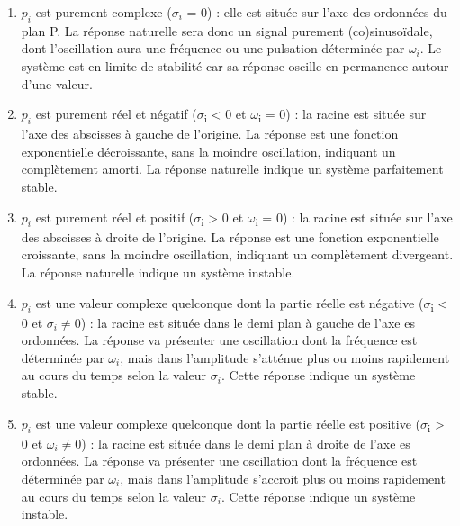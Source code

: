 \documentclass[]{report}
\begin{document}
	
	\begin{enumerate}
		\item $p_{i}$ est purement complexe ($\sigma_{i}$ = 0) : elle est située sur l'axe des ordonnées du plan P. La réponse  naturelle sera donc un signal purement (co)sinusoïdale, dont l'oscillation aura une fréquence ou une pulsation déterminée par $\omega_{i}$. Le système est en limite de stabilité car sa réponse oscille en permanence autour d'une valeur.
		\item $p_{i}$ est purement réel et négatif ($ \sigma $\textsubscript{i} \textless{} 0 et 		$ \omega $\textsubscript{i} = 0) : la racine est située sur l'axe des abscisses à 		gauche de l'origine. La réponse est une fonction exponentielle 		décroissante, sans la moindre oscillation, indiquant un complètement 		amorti. La réponse naturelle indique un système parfaitement stable.
		\item $p_{i}$ est purement réel et positif ($ \sigma $\textsubscript{i} \textgreater{} 0 et $ \omega $\textsubscript{i} = 0) : la racine est située sur l'axe des abscisses à droite de l'origine. La réponse est une fonction exponentielle croissante, sans la moindre oscillation, indiquant un complètement divergeant. La réponse naturelle indique un système instable.
		\item $p_{i}$ est une valeur complexe quelconque dont la partie réelle est négative ($ \sigma $\textsubscript{i} \textless{} 0 et  $ \sigma_{i} \neq 0 $) : la racine 	est située dans le demi plan à gauche de l'axe es ordonnées. La réponse va présenter une oscillation dont la fréquence est déterminée par $ \omega_{i}$, mais dans l'amplitude s'atténue plus ou moins rapidement au cours du temps selon la valeur  $ \sigma_{i} $. Cette réponse indique un système stable.
		\item $p_{i}$ est une valeur complexe quelconque dont la partie réelle est positive ($ \sigma $\textsubscript{i} \textgreater{} 0 et $ \omega_{i} \neq 0 $) : la racine est située dans le demi plan à droite de l'axe es ordonnées. La réponse va présenter une oscillation dont la fréquence est déterminée par $ \omega_{i} $, mais dans l'amplitude s'accroit plus ou moins rapidement au cours du temps selon la valeur  $ \sigma_{i} $. Cette réponse indique	un système instable.
		

	\end{enumerate}
	
\end{document}

